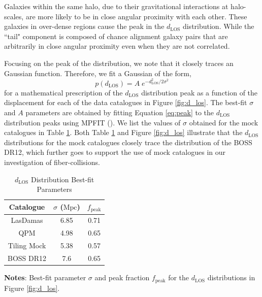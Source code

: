 \documentclass{emulateapj}
\begin{document}
Galaxies within the same halo, due to their gravitational interactions at halo-scales, are more likely to be in close angular proximity with each other. These galaxies in over-dense regions cause the peak in the $d_{\mathrm{LOS}}$ distribution. While the ``tail" component is composed of chance alignment galaxy pairs that are arbitrarily in close angular proximity even when they are not correlated. 

Focusing on the peak of the distribution, we note that it closely traces an Gaussian function. Therefore, we fit a Gaussian of the form, 
\begin{equation} \label{eq:peak} 
p(d_{\mathrm{LOS}}) = A \; e^{-{d_{\mathrm{LOS}}^2}/{2\sigma^2}}
\end{equation}
 for a mathematical prescription of the $d_{\mathrm{LOS}}$ distribution peak as a function of the displacement for each of the data catalogues in Figure \ref{fig:d_los}. The best-fit $\sigma$ and $A$ parameters are obtained by fitting Equation \ref{eq:peak} to the $d_{\mathrm{LOS}}$ distribution peaks using MPFIT (\citealt{Markwardt:2009aa}). We list the values of $\sigma$ obtained for the mock catalogues in Table \ref{tab:mpfit}. Both Table \ref{tab:mpfit} and Figure \ref{fig:d_los} illustrate that the $d_{\mathrm{LOS}}$ distributions for the mock catalogues closely trace the distribution of the BOSS DR12, which further goes to support the use of mock catalogues in our investigation of fiber-collisions.  
 
 \begin{table} 
 \caption{$d_{\mathrm{LOS}}$ Distribution Best-fit Parameters} \label{tab:mpfit}
 \begin{spacing}{1.5}
 \begin{center}
 \leavevmode
 \begin{tabular}{ccc} \hline \hline
Catalogue &$\sigma$ ($\mathrm{Mpc}$) & $f_{\mathrm{peak}}$\\ \hline
LasDamas 	& 6.85	& 0.71 \\ 
QPM 		& 4.98	& 0.65 \\ 
Tiling Mock 	& 5.38	& 0.57 \\ 
BOSS DR12 	& 7.6		& 0.65 \\ \hline
\end{tabular} \par
\end{center}
\end{spacing}
{\bf Notes}: Best-fit parameter $\sigma$ and peak fraction $f_{\mathrm{peak}}$ for the $d_{\mathrm{LOS}}$ distributions in Figure \ref{fig:d_los}. 
\end{table}
\end{document}
